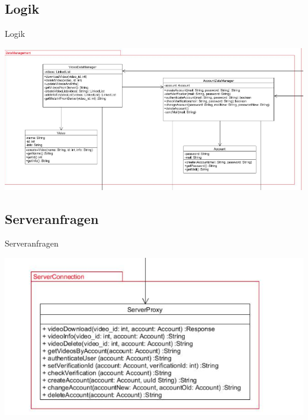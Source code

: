 \documentclass[19pt]{beamer}
\begin{document}
\subsection{Logik}
\begin{frame}{Logik}
\begin{center}
\includegraphics[scale=0.35]{resources/interface_logic.png}
\end{center}
\end{frame}
\subsection{Serveranfragen}
\begin{frame}{Serveranfragen}
\begin{center}
\includegraphics[scale=0.35]{resources/interface_serverconnection.png}
\end{center}
\end{frame}

\end{document}
